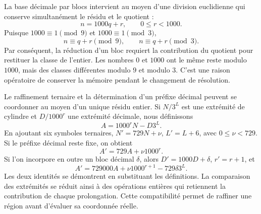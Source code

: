 La base décimale par blocs intervient au moyen d'une division euclidienne
qui conserve simultanément le résidu et le quotient :
\[
 n=1000q+r,\qquad 0\le r<1000.
\]
Puisque \(1000\equiv1\pmod9\) et \(1000\equiv1\pmod3\),
\[
 n\equiv q+r\pmod9,\qquad n\equiv q+r\pmod3.
\]
Par conséquent, la réduction d'un bloc requiert la contribution du
quotient pour restituer la classe de l'entier. Les nombres \(0\) et
\(1000\) ont le même reste modulo \(1000\), mais des classes différentes
modulo \(9\) et modulo \(3\). C'est une raison opératoire de conserver
la mémoire pendant le changement de résolution.

Le raffinement ternaire et la détermination d'un préfixe décimal
peuvent se coordonner au moyen d'un unique résidu entier. Si \(N/3^L\)
est une extrémité de cylindre et \(D/1000^r\) une extrémité décimale, nous définissons
\[
 A=1000^rN-D3^L.
\]
En ajoutant six symboles ternaires, \(N'=729N+\nu\),
\(L'=L+6\), avec \(0\le\nu<729\). Si le préfixe décimal reste
fixe, on obtient
\[
 A'=729A+\nu1000^r.
\]
Si l'on incorpore en outre un bloc décimal \(\delta\), alors \(D'=1000D+\delta\), \(r'=r+1\), et
\begin{equation}
 A'=729000A+\nu1000^{r+1}-729\delta3^L.
 \label{eq:residuo-dos-bases}
\end{equation}
Les deux identités se démontrent en substituant les définitions. La
comparaison des extrémités se réduit ainsi à des opérations entières qui
retiennent la contribution de chaque prolongation. Cette compatibilité
permet de raffiner une région avant d'évaluer sa coordonnée réelle.
